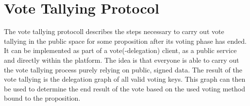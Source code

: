 


\section{Vote Tallying Protocol}
\label{sec:VoteTallyingProtocol}
The vote tallying protocoll describes the steps necessary to carry out vote tallying in the public space for some proposition after its voting phase has ended.
It can be implemented as part of a vote(-delegation) client, as a public service and directly within the platform.
The idea is that everyone is able to carry out the vote tallying process purely relying on public, signed data.
The result of the vote tallying is the delegation graph of all valid voting keys.
This graph can then be used to determine the end result of the vote based on the used voting method bound to the proposition.




